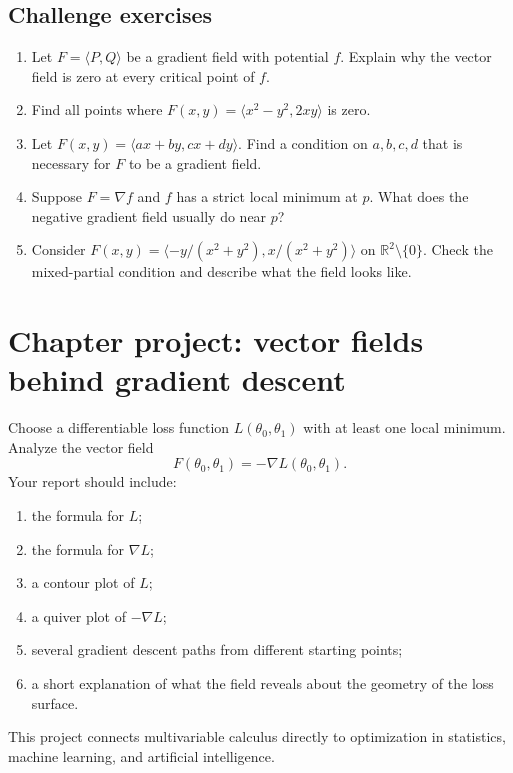 \documentclass[11pt]{article}
\newcommand{\R}{\mathbb R}
\newcommand{\grad}{\nabla}
\begin{document}
\subsection*{Challenge exercises}
\begin{enumerate}
  \item Let $F=\langle P,Q\rangle$ be a gradient field with potential $f$. Explain why the vector field is zero at every critical point of $f$.
  \item Find all points where $F(x,y)=\langle x^2-y^2,2xy\rangle$ is zero.
  \item Let $F(x,y)=\langle ax+by,cx+dy\rangle$. Find a condition on $a,b,c,d$ that is necessary for $F$ to be a gradient field.
  \item Suppose $F=\grad f$ and $f$ has a strict local minimum at $p$. What does the negative gradient field usually do near $p$?
  \item Consider $F(x,y)=\langle -y/(x^2+y^2),x/(x^2+y^2)\rangle$ on $\R^2\setminus\{0\}$. Check the mixed-partial condition and describe what the field looks like.
\end{enumerate}

\section{Chapter project: vector fields behind gradient descent}

Choose a differentiable loss function $L(\theta_0,\theta_1)$ with at least one local minimum. Analyze the vector field
\[
F(\theta_0,\theta_1)=-\grad L(\theta_0,\theta_1).
\]
Your report should include:
\begin{enumerate}
  \item the formula for $L$;
  \item the formula for $\grad L$;
  \item a contour plot of $L$;
  \item a quiver plot of $-\grad L$;
  \item several gradient descent paths from different starting points;
  \item a short explanation of what the field reveals about the geometry of the loss surface.
\end{enumerate}
This project connects multivariable calculus directly to optimization in statistics, machine learning, and artificial intelligence.
\end{document}
